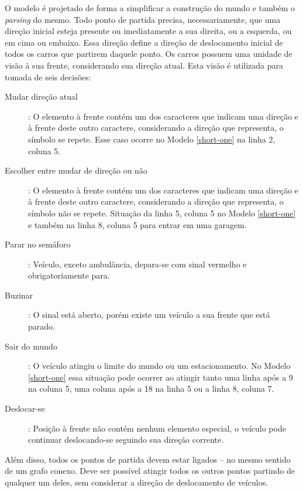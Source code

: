 O modelo é projetado de forma a simplificar a construção do mundo e
também o \textit{parsing} do mesmo. Todo ponto de partida precisa,
necessariamente, que uma direção inicial esteja presente ou
imediatamente a sua direita, ou a esquerda, ou em cima ou
embaixo. Essa direção define a direção de deslocamento inicial de
todos os carros que partirem daquele ponto. Os carros possuem uma
unidade de visão à sua frente, considerando sua direção atual. Esta
visão é utilizada para tomada de seis decisões:
\begin{description}
\item[Mudar direção atual]: O elemento à frente contém um dos
  caracteres que indicam uma direção e à frente deste outro caractere,
  considerando a direção que representa, o símbolo se repete. Esse
  caso ocorre no Modelo \ref{short-one} na linha 2, coluna 5.
\item[Escolher entre mudar de direção ou não]: O elemento à frente
  contém um dos caracteres que indicam uma direção e à frente deste
  outro caractere, considerando a direção que representa, o símbolo
  não se repete. Situação da linha 5, coluna 5 no Modelo
  \ref{short-one} e também na linha 8, coluna 5 para entrar em uma garagem.
\item[Parar no semáforo]: Veículo, exceto ambulância, depara-se com
  sinal vermelho e obrigatoriamente para.
\item[Buzinar]: O sinal está aberto, porém existe um veículo a sua
  frente que está parado.
\item[Sair do mundo]: O veículo atingiu o limite do mundo ou um
  estacionamento. No Modelo
  \ref{short-one} essa situação pode ocorrer ao atingir tanto uma
  linha após a 9 na coluna 5, uma coluna após a 18 na linha 5 ou
  a linha 8, coluna 7.
\item[Deslocar-se]: Posição à frente não contém nenhum elemento
  especial, o veículo pode continuar deslocando-se seguindo sua
  direção corrente.
\end{description}
Além disso, todos os pontos de partida devem estar ligados -- no mesmo
sentido de um grafo conexo. Deve ser possível atingir todos os outros
pontos partindo de qualquer um deles, sem considerar a direção de
deslocamento de veículos.

